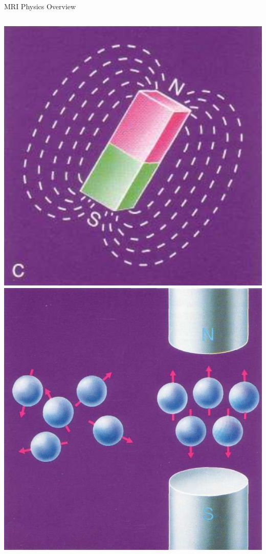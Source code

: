 \documentclass[aspectratio=169,xcolor=dvipsnames]{beamer}
\begin{document}
\begin{frame}{MRI Physics Overview}
\begin{columns}[c]
\includegraphics[width=1\textwidth]{imgs/magnet}
\includegraphics[width=1\textwidth]{imgs/extmagfield}

\end{columns}
\end{frame}
\end{document}
